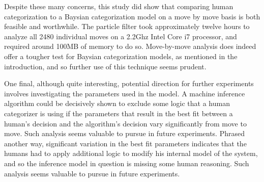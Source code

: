 Despite these many concerns, this study did show that comparing human
categorization to a Baysian categorization model on a move by move basis is both
feasible and worthwhile.  The particle filter took approximately twelve hours to
analyze all 2480 individual moves on a 2.2Ghz Intel Core i7 processor, and
required around 100MB of memory to do so. Move-by-move analysis does indeed
offer a tougher test for Baysian categorization models, as mentioned in the
introduction, and so further use of this technique seems prudent.

One final, although quite interesting, potential direction for further
experiments involves investigating the parameters used in the model. 
A machine inference algorithm could be decisively shown to exclude some logic that a human
categorizer is using if the parameters that result in the best fit between a
human's decision and the algorithm's decision vary significantly from move to move.
Such analysis seems valuable to pursue in future experiments. Phrased
another way, significant variation in the best fit parameters indicates that the
humans had to apply additional logic to modify his internal model of the
system, and so the inference model in question is missing some human reasoning.
Such analysis seems valuable to pursue in future experiments.